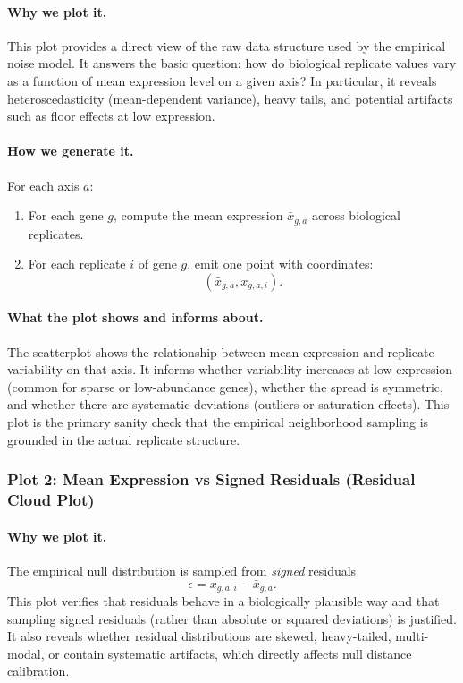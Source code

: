             \paragraph{Why we plot it.}
            This plot provides a direct view of the raw data structure used by the empirical noise model. It answers the basic question: how do biological replicate values vary as a function of mean expression level on a given axis? In particular, it reveals heteroscedasticity (mean-dependent variance), heavy tails, and potential artifacts such as floor effects at low expression.

            \paragraph{How we generate it.}
            For each axis $a$:
            \begin{enumerate}
                \item For each gene $g$, compute the mean expression $\bar{x}_{g,a}$ across biological replicates.
                \item For each replicate $i$ of gene $g$, emit one point with coordinates:
                      \[
                        (\bar{x}_{g,a}, x_{g,a,i}).
                      \]
            \end{enumerate}

            \paragraph{What the plot shows and informs about.}
            The scatterplot shows the relationship between mean expression and replicate variability on that axis. It informs whether variability increases at low expression (common for sparse or low-abundance genes), whether the spread is symmetric, and whether there are systematic deviations (outliers or saturation effects). This plot is the primary sanity check that the empirical neighborhood sampling is grounded in the actual replicate structure.

        \subsubsection{Plot 2: Mean Expression vs Signed Residuals (Residual Cloud Plot)}

            \paragraph{Why we plot it.}
            The empirical null distribution is sampled from \emph{signed} residuals
            \[
                \epsilon = x_{g,a,i} - \bar{x}_{g,a}.
            \]
            This plot verifies that residuals behave in a biologically plausible way and that sampling signed residuals (rather than absolute or squared deviations) is justified. It also reveals whether residual distributions are skewed, heavy-tailed, multi-modal, or contain systematic artifacts, which directly affects null distance calibration.

